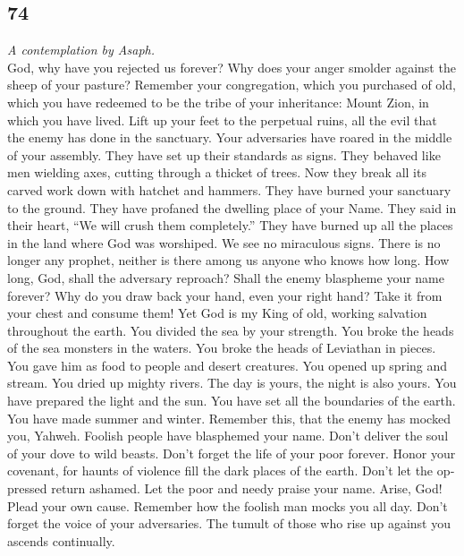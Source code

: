\begin{paracol}{2}
\switchcolumn
\begin{otherlanguage}{english}

\hypertarget{section-147}{%
\section{74}\label{section-147}}

\emph{A contemplation by Asaph.}\\
 God, why have you rejected us forever? Why does your
anger smolder against the sheep of your pasture?  Remember
your congregation, which you purchased of old, which you have redeemed
to be the tribe of your inheritance: Mount Zion, in which you have
lived.  Lift up your feet to the perpetual ruins, all the
evil that the enemy has done in the sanctuary.  Your
adversaries have roared in the middle of your assembly. They have set up
their standards as signs.  They behaved like men wielding
axes, cutting through a thicket of trees.  Now they break
all its carved work down with hatchet and hammers.  They
have burned your sanctuary to the ground. They have profaned the
dwelling place of your Name.  They said in their heart,
``We will crush them completely.'' They have burned up all the places in
the land where God was worshiped.  We see no miraculous
signs. There is no longer any prophet, neither is there among us anyone
who knows how long.  How long, God, shall the adversary
reproach? Shall the enemy blaspheme your name forever? 
Why do you draw back your hand, even your right hand? Take it from your
chest and consume them!  Yet God is my King of old,
working salvation throughout the earth.  You divided the
sea by your strength. You broke the heads of the sea monsters in the
waters.  You broke the heads of Leviathan in pieces. You
gave him as food to people and desert creatures.  You
opened up spring and stream. You dried up mighty rivers. 
The day is yours, the night is also yours. You have prepared the light
and the sun.  You have set all the boundaries of the
earth. You have made summer and winter.  Remember this,
that the enemy has mocked you, Yahweh. Foolish people have blasphemed
your name.  Don't deliver the soul of your dove to wild
beasts. Don't forget the life of your poor forever. 
Honor your covenant, for haunts of violence fill the dark places of the
earth.  Don't let the oppressed return ashamed. Let the
poor and needy praise your name.  Arise, God! Plead your
own cause. Remember how the foolish man mocks you all day.
 Don't forget the voice of your adversaries. The tumult
of those who rise up against you ascends continually.


\end{otherlanguage}
\end{paracol}
